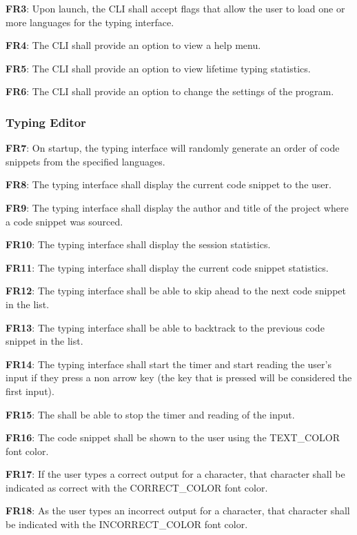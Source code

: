 \documentclass[12pt, titlepage]{article}
\begin{document}
\noindent \textbf{FR3}: Upon launch, the CLI shall accept flags that allow the user to load one or more languages for the typing interface.

\noindent \textbf{FR4}: The CLI shall provide an option to view a help menu.

\noindent \textbf{FR5}: The CLI shall provide an option to view lifetime typing statistics.

\noindent \textbf{FR6}: The CLI shall provide an option to change the settings of the program.

\subsubsection{Typing Editor}
\noindent \textbf{FR7}: On startup, the typing interface will randomly generate an order of code snippets from the specified languages.

\noindent \textbf{FR8}: The typing interface shall display the current code snippet to the user.

\noindent \textbf{FR9}: The typing interface shall display the author and title of the project where a code snippet was sourced.

\noindent \textbf{FR10}: The typing interface shall display the session statistics.

\noindent \textbf{FR11}: The typing interface shall display the current code snippet statistics.

\noindent \textbf{FR12}: The typing interface shall be able to skip ahead to the next code snippet in the list.

\noindent \textbf{FR13}: The typing interface shall be able to backtrack to the previous code snippet in the list.

\noindent \textbf{FR14}: The typing interface shall start the timer and start reading the user's input if they press a non arrow key (the key that is pressed will be considered the first input).

\noindent \textbf{FR15}: The shall be able to stop the timer and reading of the input.

\noindent \textbf{FR16}: The code snippet shall be shown to the user using the TEXT\_COLOR font color.

\noindent \textbf{FR17}: If the user types a correct output for a character, that character shall be indicated as correct with the CORRECT\_COLOR font color.

\noindent \textbf{FR18}: As the user types an incorrect output for a character, that character shall be indicated with the INCORRECT\_COLOR font color.
\end{document}
